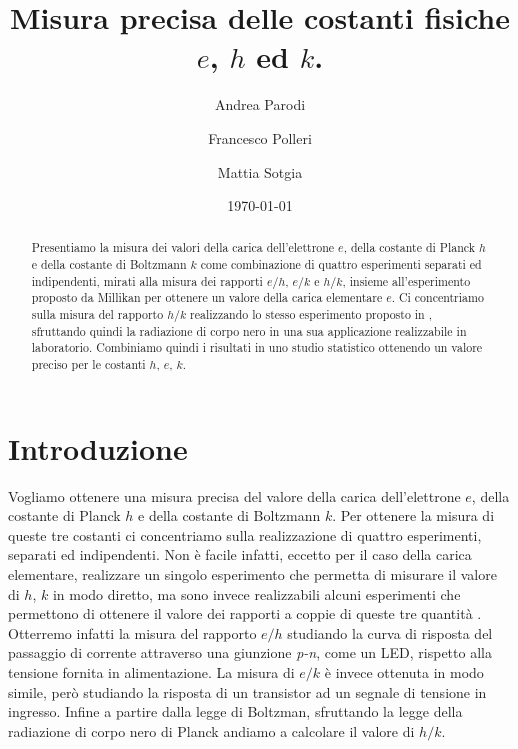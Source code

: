 \documentclass[a4paper, varvw, nofootinbib]{revtex4-2}
\begin{document}
\title{Misura precisa delle costanti fisiche $e$, $h$ ed $k$.}
\author{Andrea Parodi}
\author{Francesco Polleri}
\author{Mattia Sotgia}
\date{\today}

\begin{abstract}
Presentiamo la misura dei valori della carica dell'elettrone $e$, della costante di Planck $h$ e della costante di Boltzmann $k$ come combinazione di quattro esperimenti separati ed indipendenti, mirati alla misura dei rapporti $e/h$, $e/k$ \cite{inmanMeasurementIntroductoryPhysics1973} e $h/k$, insieme all'esperimento proposto da Millikan \cite{millikanIsolationIonPrecision1911} per ottenere un valore della carica elementare $e$. Ci concentriamo sulla misura del rapporto $h/k$ realizzando lo stesso esperimento proposto in \cite{crandallMinimalApparatusDetermination1983}, sfruttando quindi la radiazione di corpo nero in una sua applicazione realizzabile in laboratorio. Combiniamo quindi i risultati in uno studio statistico ottenendo un valore preciso per le costanti $h$, $e$, $k$.
\end{abstract}

\maketitle
\tableofcontents

\section{Introduzione}

Vogliamo ottenere una misura precisa del valore della carica dell'elettrone $e$, della costante di Planck $h$ e della costante di Boltzmann $k$. Per ottenere la misura di queste tre costanti ci concentriamo sulla realizzazione di quattro esperimenti, separati ed indipendenti. Non è facile infatti, eccetto per il caso della carica elementare, realizzare un singolo esperimento che permetta di misurare il valore di $h$, $k$ in modo diretto, ma sono invece realizzabili alcuni esperimenti che permettono di ottenere il valore dei rapporti a coppie di queste tre quantità \cite{inmanMeasurementIntroductoryPhysics1973, millikanIsolationIonPrecision1911, crandallMinimalApparatusDetermination1983}. Otterremo infatti la misura del rapporto $e/h$ studiando la curva di risposta del passaggio di corrente attraverso una giunzione \emph{p-n}, come un {LED}, rispetto alla tensione fornita in alimentazione. La misura di $e/k$ è invece ottenuta in modo simile, però studiando la risposta di un transistor ad un segnale di tensione in ingresso. Infine a partire dalla legge di Boltzman, sfruttando la legge della radiazione di corpo nero di Planck andiamo a calcolare il valore di $h/k$. 
\end{document}
